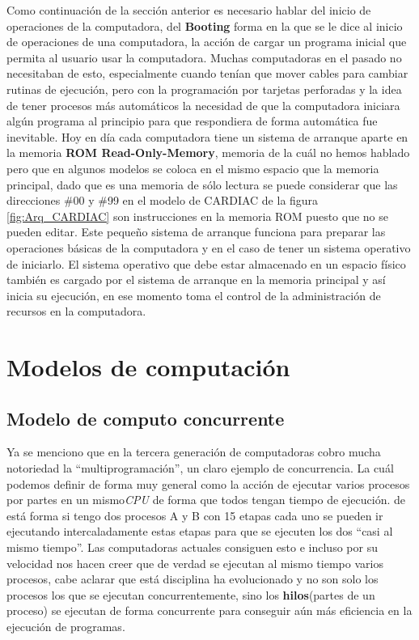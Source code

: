 \documentclass[letterpaper,12pt,oneside]{book}
\begin{document}
		Como continuación de la sección anterior es necesario hablar del inicio de operaciones de la computadora, del \textbf{Booting} forma
		en la que se le dice al inicio de operaciones de una computadora, la acción de cargar un programa inicial que permita al usuario usar
		la computadora. Muchas computadoras en el pasado no necesitaban de esto, especialmente cuando tenían que mover cables
		para cambiar rutinas de ejecución, pero con la programación por tarjetas perforadas y la idea de tener procesos más automáticos la necesidad
		de que la computadora iniciara algún programa al principio para que respondiera de forma automática fue inevitable. Hoy en día cada computadora
		tiene un sistema de arranque aparte en la memoria \textbf{ROM Read-Only-Memory}, memoria de la cuál no hemos hablado pero que en algunos modelos
		se coloca en el mismo espacio que la memoria principal, dado que es una memoria de sólo lectura se puede considerar que las direcciones
		\#00 y \#99 en el modelo de CARDIAC de la figura \ref{fig:Arq_CARDIAC} son instrucciones en la memoria ROM puesto que no se pueden editar.
		Este pequeño sistema de arranque funciona para preparar las operaciones básicas de la computadora y en el caso de tener un sistema operativo
		de iniciarlo. El sistema operativo que debe estar almacenado en un espacio físico también es cargado por el sistema de arranque en la memoria
		principal y así inicia su ejecución, en ese momento toma el control de la administración de recursos en la computadora\cite{tanenbaum_modern_2002}.

		\clearpage		
		
	\section{Modelos de computación}

		\subsection{Modelo de computo concurrente}
		
		Ya se menciono que en la tercera generación de computadoras cobro mucha notoriedad la ``multiprogramación'', un claro ejemplo
		de concurrencia. La cuál podemos definir de forma muy general como la acción de ejecutar varios procesos por partes en un mismo\textit{CPU}
		de forma que todos tengan tiempo de ejecución. de está forma si tengo dos procesos A y B con 15 etapas cada uno se pueden ir ejecutando
		intercaladamente estas etapas para que se ejecuten los dos ``casi al mismo tiempo''. Las computadoras actuales consiguen esto e incluso
		por su velocidad nos hacen creer que de verdad se ejecutan al mismo tiempo varios procesos, cabe aclarar que está disciplina ha evolucionado
		y no son solo los procesos los que se ejecutan concurrentemente, sino los \textbf{hilos}(partes de un proceso) se ejecutan de forma
		concurrente para conseguir aún más eficiencia en la ejecución de programas\cite{tanenbaum_modern_2002}.
		
\end{document}
